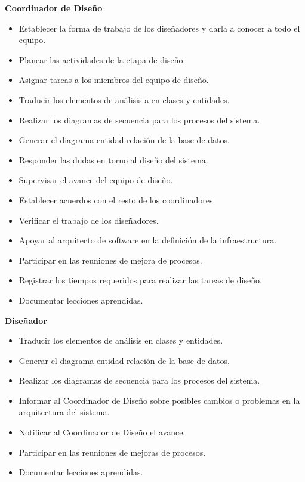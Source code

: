 \textbf{Coordinador de Diseño}
\begin{itemize}
 \item Establecer la forma de trabajo de los diseñadores y darla a conocer a todo el equipo.
 \item Planear las actividades de la etapa de diseño.
 \item Asignar tareas a los miembros del equipo de diseño.
 \item Traducir los elementos de análisis a en clases y entidades.
 \item Realizar los diagramas de secuencia para los procesos del sistema.
 \item Generar el diagrama entidad-relación de la base de datos.
 \item Responder las dudas en torno al diseño del sistema.
 \item Supervisar el avance del equipo de diseño.
 \item Establecer acuerdos con el resto de los coordinadores.
 \item Verificar el trabajo de los diseñadores.
 \item Apoyar al arquitecto de software en la definición de la infraestructura.
 \item Participar en las reuniones de mejora de procesos.
 \item Registrar los tiempos requeridos para realizar las tareas de diseño.
 \item Documentar lecciones aprendidas.\\
\end{itemize}
\newpage 
\textbf{Diseñador}
\begin{itemize}
 \item Traducir los elementos de análisis en clases y entidades.
 \item Generar el diagrama entidad-relación de la base de datos.
 \item Realizar los diagramas de secuencia para los procesos del sistema.
 \item Informar al Coordinador de Diseño sobre posibles cambios o problemas en la arquitectura del sistema.
 \item Notificar al Coordinador de Diseño el avance.
 \item Participar en las reuniones de mejoras de procesos.
 \item Documentar lecciones aprendidas.\\
\end{itemize}

